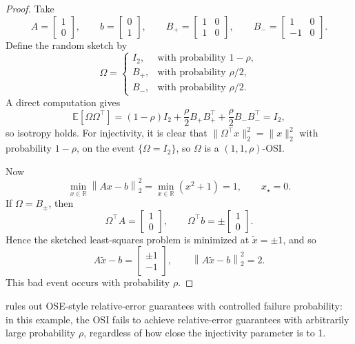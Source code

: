 \documentclass[onefignum,onetabnum]{siamart251216}
\newcommand{\R}{\mathbb{R}}
\newcommand{\E}{\mathbb{E}}
\newcommand{\norm}[1]{\left\lVert #1 \right\rVert}
\begin{document}
\begin{proof}
Take
\[
A = \begin{bmatrix}1\\0\end{bmatrix},
\qquad
b = \begin{bmatrix}0\\1\end{bmatrix},
\qquad
B_+ = \begin{bmatrix}1&0\\1&0\end{bmatrix},
\qquad
B_- = \begin{bmatrix}1&0\\-1&0\end{bmatrix}.
\]
Define the random sketch by
\[
\Omega =
\begin{cases}
I_2, & \text{with probability } 1-\rho,\\[2mm]
B_+, & \text{with probability } \rho/2,\\[2mm]
B_-, & \text{with probability } \rho/2.
\end{cases}
\]
A direct computation gives
\[
\E[\Omega\Omega^\top]
=(1-\rho)I_2 + \frac{\rho}{2} B_+B_+^\top + \frac{\rho}{2} B_-B_-^\top
= I_2,
\]
so isotropy holds. For injectivity, it is clear that $\|\Omega^\top x\|_2^2=\|x\|_2^2$ with probability $1-\rho$, on the event $\{\Omega=I_2\}$, so $\Omega$ is a $(1,1,\rho)$-OSI.

Now
\[
\min_{x\in\R} \norm{Ax-b}_2^2 = \min_{x\in\R} (x^2+1)=1,
\qquad x_\star=0.
\]
If $\Omega=B_\pm$, then
\[
\Omega^\top A = \begin{bmatrix}1\\0\end{bmatrix},
\qquad
\Omega^\top b = \pm \begin{bmatrix}1\\0\end{bmatrix}.
\]
Hence the sketched least-squares problem is minimized at $\widetilde x = \pm 1$, and so
\[
A\widetilde x - b = \begin{bmatrix}\pm 1\\-1\end{bmatrix},
\qquad
\norm{A\widetilde x-b}_2^2 = 2.
\]
This bad event occurs with probability $\rho$.
\end{proof}

 rules out OSE-style relative-error guarantees with controlled failure probability: in this example, the OSI fails to achieve relative-error guarantees with arbitrarily large probability $\rho$, regardless of how close the injectivity parameter is to 1.
\end{document}
